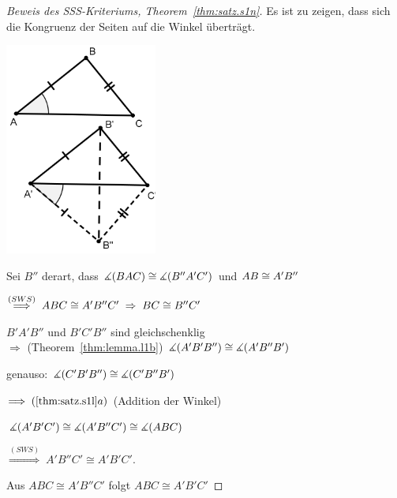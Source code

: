 \begin{proof}[Beweis des SSS-Kriteriums, Theorem~\ref{thm:satz.s1n}]
Es ist zu zeigen, dass sich die Kongruenz der Seiten
auf die Winkel \"{u}bertr\"{a}gt.


\centerline{\includegraphics[width=5cm]{BILDER/1-2-21-SSS.png}}


Sei $B''$ derart, dass $\mbox{$\measuredangle$}(BAC)\cong\mbox{$\measuredangle$}(B''A'C')$ und
${AB}\cong{A'B''}$

$\stackrel{(SWS)}{\Longrightarrow}\; ABC \cong A'B''C'\;
\Rightarrow\;{BC}\cong{B''C'}$

$B'A'B''$ und $B'C'B''$ sind gleichschenklig\\
$\Longrightarrow$ (Theorem~\ref{thm:lemma.l1b})
$\mbox{$\measuredangle$}(A'B'B'')\cong\mbox{$\measuredangle$}(A'B''B')$

genauso: $\mbox{$\measuredangle$}(C'B'B'')\cong\mbox{$\measuredangle$}(C'B''B')$

$\Longrightarrow\;(\ref{thm:satz.s1l} a)$ (Addition der Winkel)

$\mbox{$\measuredangle$}(A'B'C')\cong\mbox{$\measuredangle$}(A'B''C')\cong\mbox{$\measuredangle$}(ABC)$

$\stackrel{(SWS)}{\Longrightarrow}\; A'B''C'\cong A'B'C'$.

Aus $ABC\cong A'B''C'$ folgt $ABC\cong A'B'C'$

\end{proof}





























